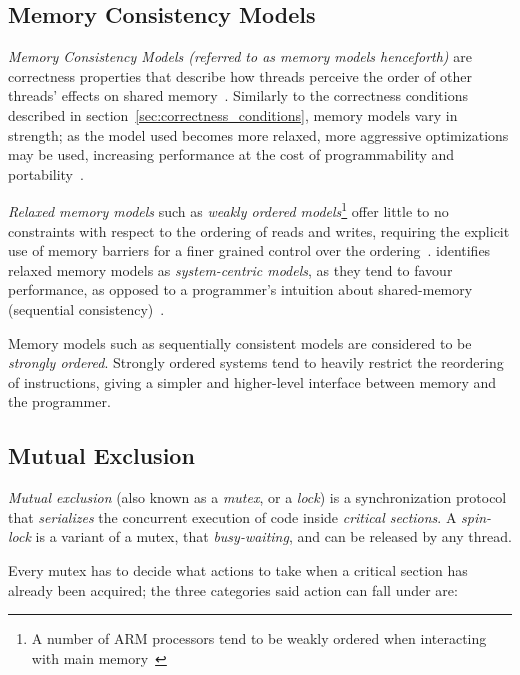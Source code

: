 \subsection{Memory Consistency Models}
\emph{Memory Consistency Models (referred to as memory models henceforth)} are correctness properties that describe how
threads perceive the order of other threads' effects on shared
memory~\citep[Section~3.7]{herlihy2020art}. Similarly to the correctness
conditions described in section~\ref{sec:correctness_conditions}, memory
models vary in strength; as the model used becomes more relaxed, more aggressive
optimizations may be used, increasing performance at the cost of
programmability and portability~\citep{gharachorloo1996consistency}.

\emph{Relaxed memory models} such as \emph{weakly ordered models}\footnote{A number of ARM processors tend to be weakly ordered when interacting with main memory~\citep[Section~A3.5.5]{arm2022architecture}} offer little to no
constraints with respect to the ordering of reads and writes, requiring the
explicit use of memory barriers for a finer grained control over the ordering~\citep{gharachorloo1996consistency}. \citeauthor{gharachorloo1996consistency} identifies relaxed
memory models as \emph{system-centric models}, as they tend to favour
performance, as opposed to a programmer's intuition about shared-memory
(sequential consistency)~\citep{gharachorloo1996consistency}.

Memory models such as sequentially consistent models are considered to be
\emph{strongly ordered}. Strongly ordered systems tend to
heavily restrict the reordering of instructions, giving a simpler and
higher-level interface between memory and the programmer. 

\subsection{Mutual Exclusion}
\emph{Mutual exclusion} (also known as a \emph{mutex}, or a \emph{lock}) is a synchronization protocol that \emph{serializes}
the concurrent execution of code inside \emph{critical sections}.
A \emph{spin-lock} is a variant of a mutex, that 
\emph{busy-waiting}, and can be released by any thread.

Every mutex has to decide what actions to take when a
critical section has already been acquired; the three categories said action
can fall under are: 


